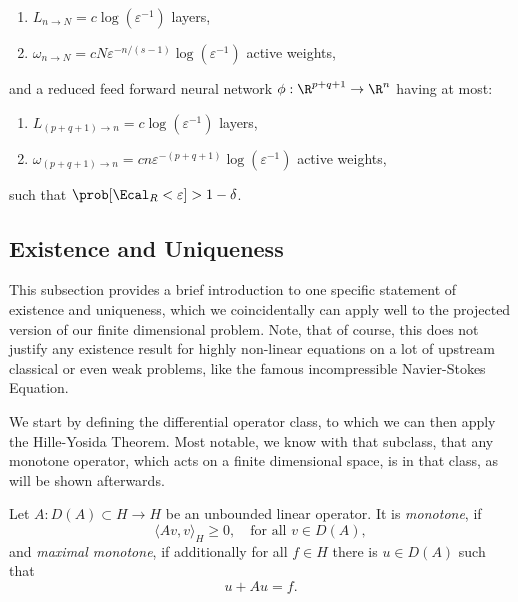 \begin{theorem}
    \begin{enumerate}
        \item[-] $L_{n \to N} = c \log(\varepsilon^{-1})$ layers,
        \item[-] $\omega_{n \to N} = cN \varepsilon^{-n/(s-1)} \log(\varepsilon^{-1})$ active weights,
    \end{enumerate}
    and a reduced feed forward neural network $\phi: \R^{p+q+1} \to \R^n$ having at most:
    \begin{enumerate}
        \item[-] $L_{(p+q+1) \to n} = c \log(\varepsilon^{-1})$ layers,
        \item[-] $\omega_{(p+q+1) \to n} = cn \varepsilon^{-(p+q+1)} \log(\varepsilon^{-1})$ active weights,
    \end{enumerate}
    such that $\prob[\Ecal_R < \varepsilon] > 1 - \delta$.
\end{theorem}



\subsection{Existence and Uniqueness}

This subsection provides a brief introduction to one specific statement of existence and uniqueness, which we coincidentally
can apply well to the projected version of our finite dimensional problem. Note, that of course, this does not justify any existence
result for highly non-linear equations on a lot of upstream classical or even weak problems, like the famous 
incompressible Navier-Stokes Equation.

We start by defining the differential operator class, to which we can then apply the Hille-Yosida Theorem. Most notable, 
we know with that subclass, that any monotone operator, which acts on a finite dimensional space, is in that class, as
will be shown afterwards. 

\begin{definition} \label{def: maximal monotone operator}
    Let $A: D(A) \subset H \to H$ be an unbounded linear operator. It is \emph{monotone}, if
    \begin{equation*}
        \langle Av, v \rangle_H \geq 0, \quad \text{for all } v \in D(A),
    \end{equation*}
    and \emph{maximal monotone}, if additionally for all $f \in H$ there is $u \in D(A)$ such that
    \begin{equation*}
        u + Au = f.
    \end{equation*}
\end{definition}


